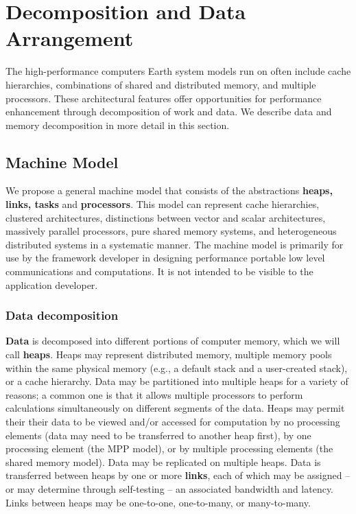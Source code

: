 \section{Decomposition and Data Arrangement}

The high-performance computers Earth system models run on often include cache hierarchies, 
combinations of shared and distributed memory, and multiple processors.  These architectural features
offer opportunities for performance enhancement through decomposition of work and data.  We 
describe data and memory decomposition in more detail in this section.

\subsection{Machine Model}

We propose a general machine model that consists of the abstractions {\bf heaps, 
links, tasks} and {\bf processors}.  This model can represent cache hierarchies,
clustered architectures, distinctions between vector and scalar architectures,
massively parallel processors, pure shared memory systems, and heterogeneous
distributed systems in a systematic manner.  The machine model is primarily
for use by the framework developer in designing performance portable 
low level communications and computations.  It is not intended to be visible 
to the application developer.

\subsubsection{Data decomposition}
{\bf Data} is decomposed into different portions of computer memory, which we will 
call {\bf heaps}.  Heaps may represent distributed memory, multiple memory
pools within the same physical memory (e.g., a default stack and a user-created
stack), or a cache hierarchy.  Data may be partitioned into multiple heaps 
for a variety of reasons; a common one is that it allows multiple processors to perform calculations simultaneously on different segments of the data.  Heaps may permit their their data to be viewed and/or accessed for computation
by no processing elements (data may need to be transferred to another heap first), by one processing element (the MPP model), or by multiple processing 
elements (the shared memory model).  Data may be replicated on multiple heaps.  Data is transferred between heaps by one or more {\bf links}, each of which
may be assigned -- or may determine through self-testing -- an associated 
bandwidth and latency.  Links between heaps may be one-to-one, one-to-many, or 
many-to-many.   

